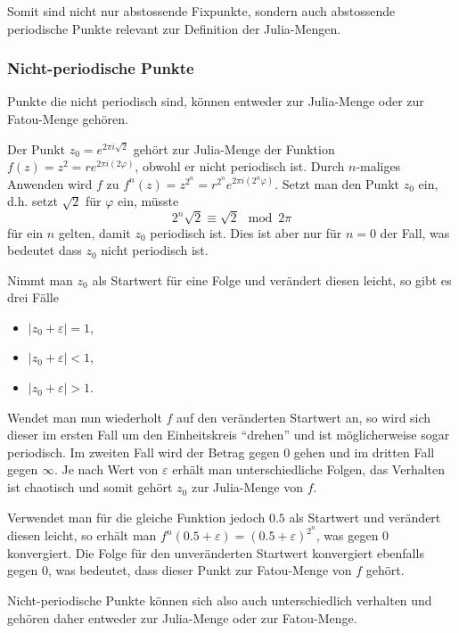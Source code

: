 Somit sind nicht nur abstossende Fixpunkte, sondern auch abstossende periodische Punkte relevant zur Definition der Julia-Mengen.

\subsubsection{Nicht-periodische Punkte}
\label{julia:sec:nicht_periodisch}
Punkte die nicht periodisch sind, können entweder zur Julia-Menge oder zur Fatou-Menge gehören.

\begin{beispiel}
Der Punkt $z_0 = e^{2\pi i\sqrt{2}}$ gehört zur Julia-Menge der Funktion $f(z) = z^2 = r e^{2\pi i(2 \varphi)}$, obwohl er nicht periodisch ist.
Durch $n$-maliges Anwenden wird $f$ zu $f^n(z) = z^{2^n} = r^{2^n} e^{2\pi i(2^n \varphi)}$.
Setzt man den Punkt $z_0$ ein, d.h. setzt $\sqrt{2}$ für $\varphi$ ein, müsste
\begin{equation*}
    2^n \sqrt{2} \equiv \sqrt{2} \mod{2\pi}
\end{equation*}
für ein $n$ gelten, damit $z_0$ periodisch ist.
Dies ist aber nur für $n = 0$ der Fall, was bedeutet dass $z_0$ nicht periodisch ist.

Nimmt man $z_0$ als Startwert für eine Folge und verändert diesen leicht, so gibt es drei Fälle
\begin{itemize}
    \item $|z_0 + \varepsilon| = 1$,
    \item $|z_0 + \varepsilon| < 1$,
    \item $|z_0 + \varepsilon| > 1$.
\end{itemize}
Wendet man nun wiederholt $f$ auf den veränderten Startwert an, so wird sich dieser im ersten Fall um den Einheitskreis ``drehen'' und ist möglicherweise sogar periodisch.
Im zweiten Fall wird der Betrag gegen $0$ gehen und im dritten Fall gegen $\infty$.
Je nach Wert von $\varepsilon$ erhält man unterschiedliche Folgen, das Verhalten ist chaotisch und somit gehört $z_0$ zur Julia-Menge von $f$.

Verwendet man für die gleiche Funktion jedoch $0.5$ als Startwert und verändert diesen leicht, so erhält man $f^n(0.5 + \varepsilon) = (0.5 + \varepsilon)^{2^n}$, was gegen $0$ konvergiert.
Die Folge für den unveränderten Startwert konvergiert ebenfalls gegen $0$, was bedeutet, dass dieser Punkt zur Fatou-Menge von $f$ gehört.
\label{julia:nicht_periodisch_julia}
\end{beispiel}

Nicht-periodische Punkte können sich also auch unterschiedlich verhalten und gehören daher entweder zur Julia-Menge oder zur Fatou-Menge.


